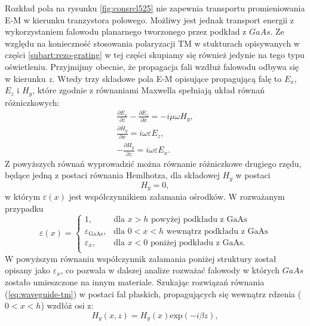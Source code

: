 Rozkład pola na rysunku \ref{fig:consrcl525} nie zapewnia transportu promieniowania E-M w kierunku tranzystora polowego. Możliwy jest jednak transport energii z wykorzystaniem falowodu planarnego tworzonego przez podkład z $GaAs$. Ze względu na konieczność stosowania polaryzacji TM w stukturach opisywanych w części \ref{subart:rezo-grating} w tej części skupiamy się również jedynie na tego typu oświetleniu. Przyjmijmy obecnie, że propagacja fali wzdłuż falowodu odbywa się w kierunku $z$. Wtedy trzy składowe pola E-M opisujące propagującą falę to $E_x$,$E_z$ i $H_y$, które zgodnie z równaniami Maxwella spełniają układ równań różniczkowych:
\begin{equation}
\begin{gathered}
	\frac{\partial E_x}{\partial z} - \frac{\partial E_z}{\partial x} = -i \mu \omega H_y,\\	
	\frac{\partial H_y}{\partial x} = i \omega \varepsilon E_z, \\
	- \frac{\partial H_y}{\partial z} = i \omega \varepsilon E_x.
\end{gathered}
\end{equation}
Z powyższych równań wyprowadzić można równanie różniczkowe drugiego rzędu, będące jedną z postaci równania Hemlhotza, dla składowej $H_y$ w postaci
\begin{equation}
	[ \frac{\partial^2}{\partial x^2} + \frac{\partial^2}{\partial z^2} + \omega^2 \mu_0 \varepsilon (x) ] H_y = 0,
	\label{eq:waveguide-tm}
\end{equation}
w którym $\varepsilon(x)$ jest współczynnikiem załamania ośrodków. W rozważanym przypadku
\begin{equation}
\varepsilon(x)=  
\begin{cases} 
	1, & \mbox{dla } x>h\mbox{ powyżej podkładu z GaAs } \\ 
	\varepsilon_{\textrm{GaAs}}, & \mbox{dla } 0<x<h\mbox{ wewnątrz podkładu z GaAs} \\
	\varepsilon_x,	&	\mbox{dla } x<0\mbox{ poniżej podkładu z GaAs}.\\
\end{cases}
\end{equation}
W powyższym równaniu współczynnik załamania poniżej struktury został opisany jako $\varepsilon_x$, co pozwala w dalszej analize rozważać falowody w których $GaAs$ zostało umieszczone na innym materiale. Szukając rozwiązań równania (\ref{eq:waveguide-tm}) w postaci fal płaskich, propagujących się wewnątrz rdzenia ($0<x<h$) wzdłóż osi z:
\begin{equation}
	H_y(x,z)=H_y(x) \textrm{exp}(-i \beta z),
\end{equation}
